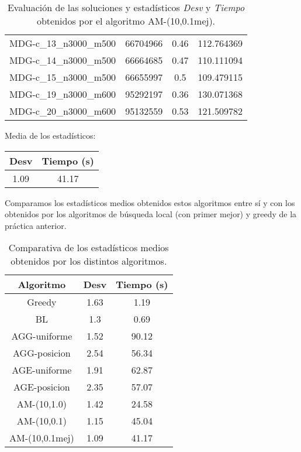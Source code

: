 \documentclass{article}
\begin{document}
\begin{table}[H]
\begin{tabular}{|cccc|}
		MDG-c\_13\_n3000\_m500 & 66704966 & 0.46 & 112.764369\\
		MDG-c\_14\_n3000\_m500 & 66664685 & 0.47 & 110.111094\\
		MDG-c\_15\_n3000\_m500 & 66655997 & 0.5 & 109.479115\\
		MDG-c\_19\_n3000\_m600 & 95292197 & 0.36 & 130.071368\\
		MDG-c\_20\_n3000\_m600 & 95132559 & 0.53 & 121.509782\\
		\hline
	\end{tabular}
	\caption{Evaluación de las soluciones y estadísticos \emph{Desv} y \emph{Tiempo} obtenidos por el algoritmo AM-(10,0.1mej).}
	\label{tab:am-10-01mej}
\end{table}

Media de los estadísticos:
\begin{table}[H]
	\centering
	\begin{tabular}{|cc|}
		\hline
		Desv & Tiempo (s)\\ \hline
		1.09 & 41.17 \\
		\hline
	\end{tabular}
\end{table}

\pagebreak

Comparamos los estadísticos medios obtenidos estos algoritmos entre sí y con los obtenidos por los algoritmos
de búsqueda local (con primer mejor) y greedy de la práctica anterior.

\begin{table}[H]
	\centering
	\begin{tabular}{|ccc|}
		\hline
		Algoritmo & Desv & Tiempo (s)\\ \hline
		Greedy & 1.63 & 1.19 \\
		BL & 1.3 & 0.69 \\
		AGG-uniforme & 1.52 & 90.12 \\
		AGG-posicion & 2.54 & 56.34 \\
		AGE-uniforme & 1.91 & 62.87 \\
		AGE-posicion & 2.35 & 57.07 \\
		AM-(10,1.0) & 1.42 & 24.58 \\
		AM-(10,0.1) & 1.15 & 45.04 \\
		AM-(10,0.1mej) & 1.09 & 41.17 \\
		\hline
	\end{tabular}
	\caption{Comparativa de los estadísticos medios obtenidos por los distintos algoritmos.}
	\label{tab:comparativa}
\end{table}
\end{document}
